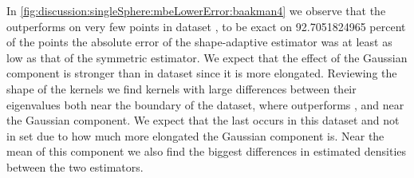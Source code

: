 



	
		In \cref{fig:discussion:singleSphere:mbeLowerError:baakman4} we observe that the \mbe outperforms \sambe on very few points in dataset \baakmanFour, to be exact on \num{92.7051824965} percent of the points the absolute error of the shape-adaptive estimator was at least as low as that of the symmetric estimator. We expect that the effect of the Gaussian component is stronger than in dataset \baakmanOne since it is more elongated.
		Reviewing the shape of the kernels we find kernels with large differences between their eigenvalues both near the boundary of the dataset, where \sambe outperforms \mbe, and near the Gaussian component. We expect that the last occurs in this dataset and not in set \baakmanOne due to how much more elongated the Gaussian component is. 
		Near the mean of this component we also find the biggest differences in estimated densities between the two estimators.





